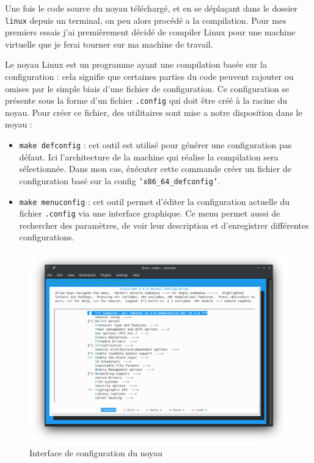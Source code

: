 Une fois le code source du noyau téléchargé, et en se déplaçant dans le dossier \texttt{linux} depuis un terminal, on peu alors procédé a la compilation. Pour mes premiers essais j'ai premièrement décidé de compiler Linux pour une machine virtuelle que je ferai tourner sur ma machine de travail.

Le noyau Linux est un programme ayant une compilation basée sur la configuration : cela signifie que certaines parties du code peuvent rajouter ou omises par le simple biais d'une fichier de configuration. Ce configuration se présente sous la forme d'un fichier \texttt{.config} qui doit être créé à la racine du noyau. Pour créer ce fichier, des utilitaires sont mise a notre disposition dans le noyau :
\begin{itemize}
    \item \texttt{make defconfig} : cet outil est utilisé pour générer une configuration pas défaut. Ici l'architecture de la machine qui réalise la compilation sera sélectionnée. Dans mon cas, éxécuter cette commande créer un fichier de configuration basé sur la config \texttt{'x86\_64\_defconfig'}.
    \item \texttt{make menuconfig} : cet outil permet d'éditer la configuration actuelle du fichier \texttt{.config} via une interface graphique. Ce menu permet aussi de rechercher des paramètres, de voir leur description et d'enregistrer différentes configurations.
\end{itemize}

\begin{figure}[H]
    \centering
    \includegraphics[width=0.65\paperwidth]{Images/make menuconfig.png}
    \caption{Interface de configuration du noyau}
\end{figure}

